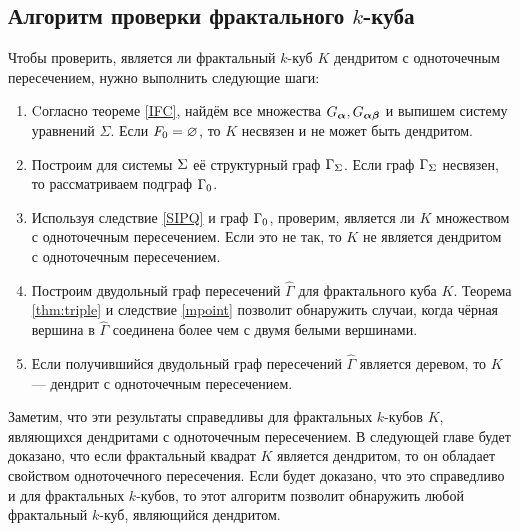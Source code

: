 \subsection{Алгоритм проверки фрактального $k$-куба}

Чтобы проверить, является ли фрактальный $k$-куб $K$ дендритом с одноточечным пересечением, нужно выполнить следующие шаги:

\begin{enumerate}

\item Cогласно теореме \ref{IFC}, найдём все множества $G_{\bm{\alpha}}, G_{{\bm{\alpha}}{\bm{\beta}}}$ и выпишем систему уравнений $\Sigma$.
Если $F_0=\varnothing$, то $K$ несвязен и не может быть дендритом.

\item Построим для системы $\Sigma$ её структурный граф $\Gamma_\Sigma$.
Если граф $\Gamma_\Sigma$ несвязен, то рассматриваем подграф $\Gamma_0$.
 
\item Используя следствие \ref{SIPQ} и граф $\Gamma_0$, проверим, является ли $K$ множеством с одноточечным пересечением.
Если это не так, то $K$ не является дендритом с одноточечным пересечением.
    
\item Построим двудольный граф пересечений $\hat\Gamma$ для фрактального куба $K$.
Теорема \ref{thm:triple} и следствие \ref{mpoint} позволит обнаружить случаи, когда чёрная вершина в $\hat\Gamma$ соединена более чем с двумя белыми вершинами.

\item Если получившийся двудольный граф пересечений $\hat\Gamma$ является деревом, то $K$ --- дендрит с одноточечным пересечением.    
\end{enumerate}

\begin{remark}
Заметим, что эти результаты справедливы для фрактальных $k$-кубов $K$, являющихся дендритами с одноточечным пересечением.
В следующей главе будет доказано, что если фрактальный квадрат $K$ является дендритом, то он обладает свойством одноточечного пересечения.
Если будет доказано, что это справедливо и для фрактальных $k$-кубов, то этот алгоритм позволит обнаружить любой фрактальный $k$-куб, являющийся дендритом.
\end{remark}

